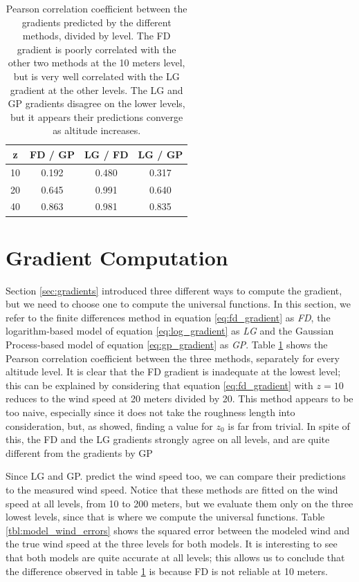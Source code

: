 \documentclass[a4paper,11pt]{kth-mag}
\begin{document}
\begin{table}[]
\centering
\caption{Pearson correlation coefficient between the gradients predicted by the different methods, divided by level. The FD gradient is poorly correlated with the other two methods at the 10 meters level, but is very well correlated with the LG gradient at the other levels. The LG and GP gradients disagree on the lower levels, but it appears their predictions converge as altitude increases.}
\label{tbl:gradients_corr}
\begin{tabular}{c|c|c|c}
\toprule
\textbf{z} & \textbf{FD / GP} & \textbf{LG / FD} & \textbf{LG / GP} \\ \midrule
 	10 & 	0.192 & 0.480 &	0.317 \\
 	20 &	0.645 	& 0.991 &	0.640 \\
 	40 &	0.863 & 0.981 &	0.835 \\
\bottomrule
\end{tabular}
\end{table}


\section{Gradient Computation}
\label{sec:res_gradient}
Section \ref{sec:gradients} introduced three different ways to compute the gradient, but we need to choose one to compute the universal functions. In this section, we refer to the finite differences method in equation \ref{eq:fd_gradient} as \emph{FD}, the logarithm-based model of equation \ref{eq:log_gradient} as \emph{LG} and the Gaussian Process-based model of equation \ref{eq:gp_gradient} as \emph{GP}. Table \ref{tbl:gradients_corr} shows the Pearson correlation coefficient between the three methods, separately for every altitude level. It is clear that the FD gradient is inadequate at the lowest level; this can be explained by considering that equation \ref{eq:fd_gradient} with $z=10$ reduces to the wind speed at 20 meters divided by 20. This method appears to be too naive, especially since it does not take the roughness length into consideration, but, as \cite{cabauw_z0} showed, finding a value for $z_0$ is far from trivial. In spite of this, the FD and the LG gradients strongly agree on all levels, and are quite different from the gradients by GP

Since LG and GP. predict the wind speed too, we can compare their predictions to the measured wind speed. Notice that these methods are fitted on the wind speed at all levels, from 10 to 200 meters, but we evaluate them only on the three lowest levels, since that is where we compute the universal functions. Table \ref{tbl:model_wind_errors} shows the squared error between the modeled wind and the true wind speed at the three levels for both models. It is interesting to see that both models are quite accurate at all levels; this allows us to conclude that the difference observed in table \ref{tbl:gradients_corr} is because FD is not reliable at 10 meters.
\end{document}
